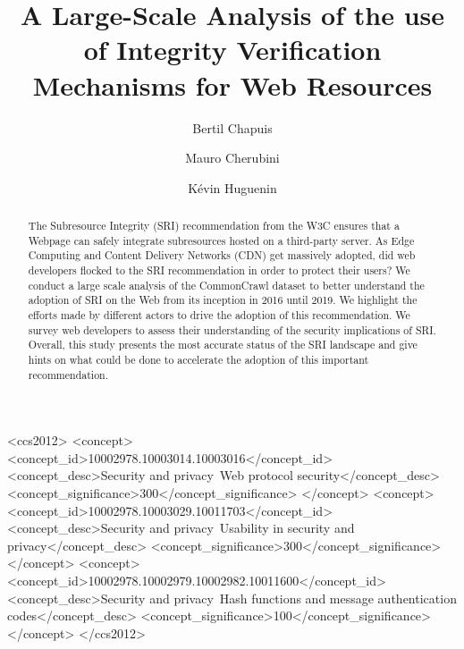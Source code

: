 \documentclass[sigconf,table]{acmart}
\def\thetitle{A Large-Scale Analysis of the use of Integrity Verification Mechanisms for Web Resources}
\def\theshorttitle{Automating the Integrity Verification of Web Downloads for the Masses}
\begin{document}
\title[\theshorttitle]{\thetitle}

 
\author{Bertil Chapuis} %

\author{Mauro Cherubini}
 
\author{Kévin Huguenin}

\renewcommand{\shortauthors}{Chapuis et al.}

\begin{abstract}

The Subresource Integrity (SRI) recommendation from the W3C ensures that a Webpage can safely integrate subresources hosted on a third-party server.
As Edge Computing and Content Delivery Networks (CDN) get massively adopted, did web developers flocked to the SRI recommendation in order to protect their users?
We conduct a large scale analysis of the CommonCrawl dataset to better understand the adoption of SRI on the Web from its inception in 2016 until 2019.
We highlight the efforts made by different actors to drive the adoption of this recommendation.
We survey web developers to assess their understanding of the security implications of SRI.
Overall, this study presents the most accurate status of the SRI landscape and give hints on what could be done to accelerate the adoption of this important recommendation.
\end{abstract}

\begin{CCSXML}
<ccs2012>
<concept>
<concept_id>10002978.10003014.10003016</concept_id>
<concept_desc>Security and privacy~Web protocol security</concept_desc>
<concept_significance>300</concept_significance>
</concept>
<concept>
<concept_id>10002978.10003029.10011703</concept_id>
<concept_desc>Security and privacy~Usability in security and privacy</concept_desc>
<concept_significance>300</concept_significance>
</concept>
<concept>
<concept_id>10002978.10002979.10002982.10011600</concept_id>
<concept_desc>Security and privacy~Hash functions and message authentication codes</concept_desc>
<concept_significance>100</concept_significance>
</concept>
</ccs2012>
\end{CCSXML}
\end{document}
